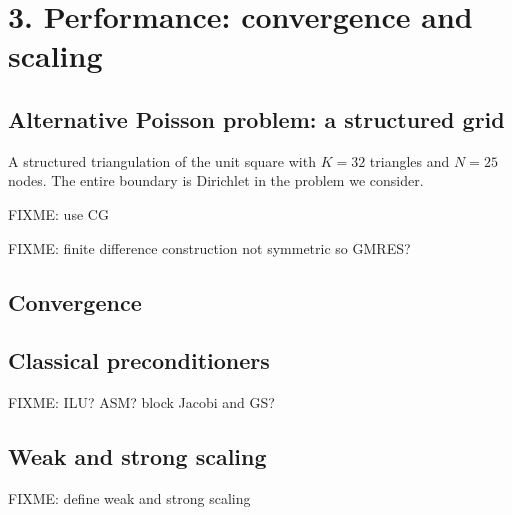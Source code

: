
\chapter{3. Performance: convergence and scaling}

\section{Alternative Poisson problem: a structured grid}


\begin{marginfigure}

\caption{A structured triangulation of the unit square with $K=32$ triangles and $N=25$ nodes.  The entire boundary is Dirichlet in the problem we consider.}
\label{fig:structuredfem}
\end{marginfigure}

FIXME: use CG

FIXME: finite difference construction not symmetric so GMRES?


\section{Convergence}

\section{Classical preconditioners}

FIXME:  ILU?  ASM?  block Jacobi and GS?

\section{Weak and strong scaling}

FIXME: define weak and strong scaling

